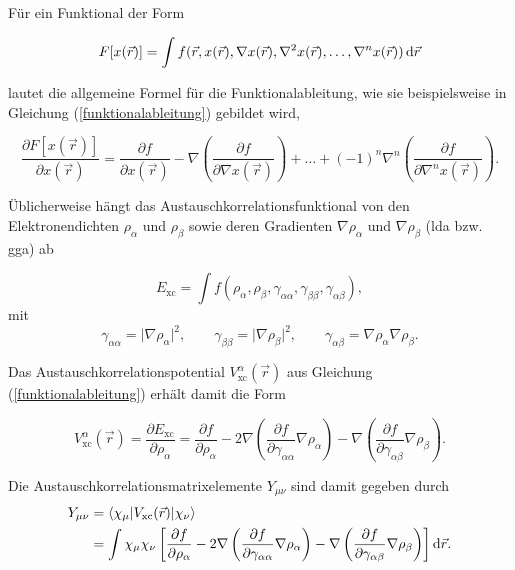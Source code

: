 \bigskip
\textcolor{myred}{Für ein Funktional der Form\supercite{treutlerphdthesis}}

\begin{equation}
 F[x(\vec{r})]=\int f(\vec{r},x(\vec{r}),\nabla x(\vec{r}),\nabla^2 x(\vec{r}),\dotsc,\nabla^n x(\vec{r}))\mathop{}\!\mathrm{d} \vec{r}
\end{equation}

lautet die allgemeine Formel für die Funktionalableitung, wie sie beispielsweise in Gleichung (\ref{funktionalableitung}) gebildet wird,

\begin{equation}
  \frac{\partial F[x(\vec{r})]}{\partial x(\vec{r})}=\frac{\partial f}{\partial x(\vec{r})}-\nabla\left(\frac{\partial f}{\partial \nabla x(\vec{r})}\right)+\dotsc+(-1)^n\nabla^n\left(\frac{\partial f}{\partial\nabla^n x(\vec{r})}\right).
\end{equation}

Üblicherweise hängt das Austauschkorrelationsfunktional von den Elektronendichten $\rho_\alpha$ und $\rho_\beta$ sowie deren Gradienten $\nabla \rho_\alpha$ und $\nabla \rho_\beta$ (\ac{lda} bzw. \ac{gga}) ab

\begin{equation}
  E_{\textrm{xc}}=\int f\left(\rho_\alpha,\rho_\beta,\gamma_{\alpha\alpha},\gamma_{\beta\beta},\gamma_{\alpha\beta}\right),
\end{equation}
mit 
\begin{equation}
\gamma_{\alpha\alpha}=\vert\nabla\rho_\alpha\vert^2,\qquad\gamma_{\beta\beta}=\vert\nabla\rho_\beta\vert^2,\qquad\gamma_{\alpha\beta}=\nabla\rho_\alpha\nabla\rho_\beta.
\end{equation}

Das Austauschkorrelationspotential $V_{\textrm{xc}}^\alpha(\vec{r})$ aus Gleichung (\ref{funktionalableitung}) erhält damit die Form

\begin{equation}
  V_{\textrm{xc}}^\alpha(\vec{r})=\frac{\partial E_{\textrm{xc}}}{\partial \rho_\alpha}=\frac{\partial f}{\partial\rho_\alpha}-2\nabla\left(\frac{\partial f}{\partial \gamma_{\alpha\alpha}}\nabla\rho_\alpha\right)-\nabla\left(\frac{\partial f}{\partial \gamma_{\alpha\beta}}\nabla\rho_\beta\right).
\end{equation}

Die Austauschkorrelationsmatrixelemente $Y_{\mu\nu}$ sind damit gegeben durch
\begin{equation}
\begin{aligned}
  Y_{\mu\nu}&=\langle\chi_\mu\vert V_{\textrm{xc}}(\vec{r})\vert\chi_\nu\rangle\\
  &=\int\chi_\mu\chi_\nu\left[\frac{\partial f}{\partial\rho_\alpha}-2\nabla\left(\frac{\partial f}{\partial \gamma_{\alpha\alpha}}\nabla\rho_\alpha\right)-\nabla\left(\frac{\partial f}{\partial \gamma_{\alpha\beta}}\nabla\rho_\beta\right)\right]\mathop{}\!\mathrm{d} \vec{r}.
\end{aligned}
\end{equation}

